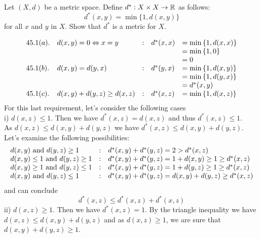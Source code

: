 \renewcommand{\thesubsection}{\thesection.\arabic{subsection}}
\subsection{}
\begin{tcolorbox}
Let $(X, d)$ be a metric space. Define $d^*:X \times X \rightarrow \mathbb{R}$ as follows:
$$d^*(x,y) = \min{\{1, d(x, y)\}}$$
for all $x$ and $y$ in $X$. Show that $d^*$ is a metric for $X$.
\end{tcolorbox}
\begin{align*}
\begin{array}{l l l l l}
 45.1(a).& d(x, y) = 0 \Leftrightarrow  x =y&:&d^*(x, x)& =\min{\{1, d(x, x)\}}\\
 &&&&=\min{\{1, 0\}}\\
 &&&&=0\\
 45.1(b). &d(x, y) = d(y, x)&:&d^*(y, x)&=\min{\{1, d(x, y)\}}\\
 &&&&=\min{\{1, d(y, x)\}}\\
 &&&&=d^*(x, y)\\
45.1 (c). &d(x,y) + d(y, z)\geq d(x, z)&:&d^*(x, z)&=\min{\{1, d(x, z)\}}
\end{array}
\end{align*}
For this last requirement, let's consider the following cases\\
i) $d(x, z)\leq 1$. Then we have $d^*(x, z)=d(x, z)$ and thus $d^*(x, z)\leq 1$.\\
 As $d(x, z)\leq d(x, y)+d(y, z)$ we have $d^*(x, z)\leq d(x, y)+d(y, z)$.\\
 Let's examine the following possibilities:
\begin{align*}
\begin{array}{l c  l}
d(x, y)\text{ and } d(y, z)\geq 1&: &d^*(x, y)+d^*(y, z)=2>d^*(x, z)\\
d(x, y)\leq 1\text{ and } d(y, z)\geq 1&: &d^*(x, y)+d^*(y, z)=1+d(x, y)\geq 1 \geq d^*(x, z)\\
d(x, y)\geq 1 \text{ and } d(y, z)\leq 1&: &d^*(x, y)+d^*(y, z)=1+d(y, z)\geq 1\geq d^*(x, z)\\
d(x, y)\text{ and } d(y, z)\leq 1&: &d^*(x, y)+d^*(y, z)=d(x, y)+d(y, z)\geq d^*(x, z)
\end{array}
\end{align*}
and can conclude $$d^*(x, z)\leq d^*(x, z)+d^*(x, z)$$
ii) $d(x, z)\geq 1$. Then we have $d^*(x, z)=1$. By the triangle inequality we have $d(x, z)\leq d(x, y)+d(y, z)$ and as $d(x, z)\geq 1$, we are sure that $d(x, y)+d(y, z)\geq 1$.\\
